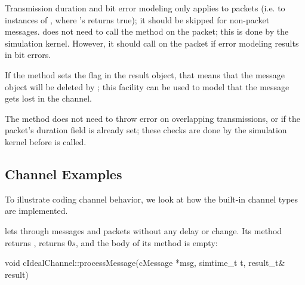 Transmission duration and bit error modeling only applies to packets (i.e.
to instances of , where 's
 returns true); it should be skipped for non-packet
messages.  does not need to call the 
method on the packet; this is done by the simulation kernel. However,
it should call  on the packet
if error modeling results in bit errors.

If the method sets the  flag in the result object, that
means that the message object will be deleted by {\opp}; this facility
can be used to model that the message gets lost in the channel.

The  method does not need to throw error on overlapping
transmissions, or if the packet's duration field is already set; these
checks are done by the simulation kernel before  is called.

%
%
%


\subsection{Channel Examples}

To illustrate coding channel behavior, we look at how the built-in channel
types are implemented.

 lets through messages and packets without
any delay or change. Its  method returns
,  returns $0s$, and the
body of its  method is empty:

\begin{cpp}
void cIdealChannel::processMessage(cMessage *msg, simtime_t t, result_t& result)
{
}
\end{cpp}

